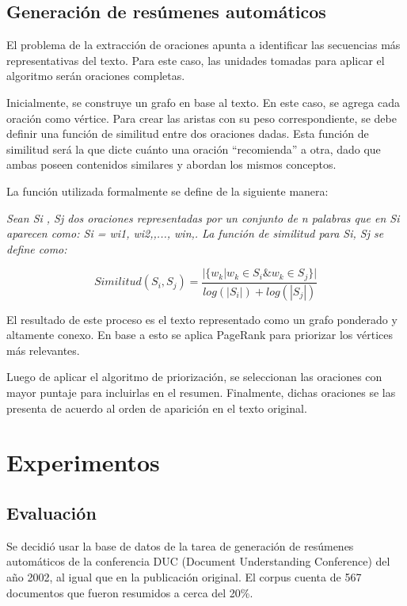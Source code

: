 \documentclass{llncs}
\begin{document}
\subsection{Generación de resúmenes automáticos}
El problema de la extracción de oraciones apunta a identificar las secuencias más representativas del texto. Para este caso, las unidades tomadas para aplicar el algoritmo serán oraciones completas.

Inicialmente, se construye un grafo en base al texto. En este caso, se agrega cada oración como vértice. Para crear las aristas con su peso correspondiente, se debe definir una función de similitud entre dos oraciones dadas. Esta función de similitud será la que dicte cuánto una oración “recomienda” a otra, dado que ambas poseen contenidos similares y abordan los mismos conceptos.
    
La función utilizada formalmente se define de la siguiente manera:

\textit{Sean Si , Sj dos oraciones representadas por un conjunto de n palabras que en Si aparecen como: Si = wi1, wi2,,..., win,. La función de similitud para Si, Sj se define como:}

\begin{equation}
Similitud(S_{i},S_{j}) = \frac{ | \{   w_{k} | w_{k} \in S_{i} \& w_{k} \in S_{j}   \}  | }    
                              {  log(|S_{i}|) + log(|S_{j}|)  }
\end{equation}
    
El resultado de este proceso es el texto representado como un grafo ponderado y altamente conexo. En base a esto se aplica PageRank para priorizar los vértices más relevantes.

Luego de aplicar el algoritmo de priorización, se seleccionan las oraciones con mayor puntaje para incluirlas en el resumen. Finalmente, dichas oraciones se las presenta de acuerdo al orden de aparición en el texto original.


\section{Experimentos}

\subsection{Evaluación}
Se decidió usar la base de datos de la tarea de generación de resúmenes automáticos de la conferencia DUC (Document Understanding Conference) del año 2002, al igual que en la publicación original. El corpus cuenta de 567 documentos que fueron resumidos a cerca del 20\%.
\end{document}
